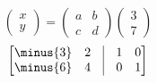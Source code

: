 \documentclass[crop=false,class=article,oneside]{standalone}
\begin{document}
        \begin{equation}
            \begin{pmatrix}
                x\\y
            \end{pmatrix}
            =
            \begin{pmatrix}
                a&b\\
                c&d
            \end{pmatrix}
            \begin{pmatrix}
                3\\7
            \end{pmatrix}
        \end{equation}
        \begin{equation}
            \begin{bmatrix}
                \minus{3}&2&\vline&1&0\\
                \minus{6}&4&\vline&0&1
            \end{bmatrix}
        \end{equation}
\end{document}
